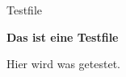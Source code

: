 \documentclass[10pt,a4paper]{article}
\begin{document}
\caption{Testfile}

\textbf{Das ist eine Testfile}

Hier wird was getestet.
\end{document}
